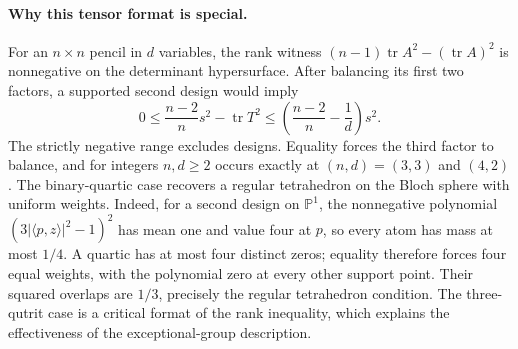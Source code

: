 \paragraph{Why this tensor format is special.}
For an \(n\times n\) pencil in \(d\) variables, the rank witness
\((n-1)\operatorname{tr}A^2-(\operatorname{tr}A)^2\) is nonnegative on
the determinant hypersurface. After balancing its first two factors,
a supported second design would imply
\[
 0\le\frac{n-2}{n}s^2-\operatorname{tr}T^2
 \le\left(\frac{n-2}{n}-\frac1d\right)s^2.
\]
The strictly negative range excludes designs. Equality forces the
third factor to balance, and for integers \(n,d\ge2\) occurs exactly at
\((n,d)=(3,3)\) and \((4,2)\). The binary-quartic case recovers a regular
tetrahedron on the Bloch sphere with uniform weights. Indeed, for a
second design on \(\mathbb P^1\), the nonnegative polynomial
\((3|\langle p,z\rangle|^2-1)^2\) has mean one and value four at \(p\),
so every atom has mass at most \(1/4\). A quartic has at most four
distinct zeros; equality therefore forces four equal weights, with
the polynomial zero at every other support point. Their squared
overlaps are \(1/3\), precisely the regular tetrahedron condition.
The three-qutrit case is a critical format of the rank inequality,
which explains the effectiveness of the exceptional-group description.
